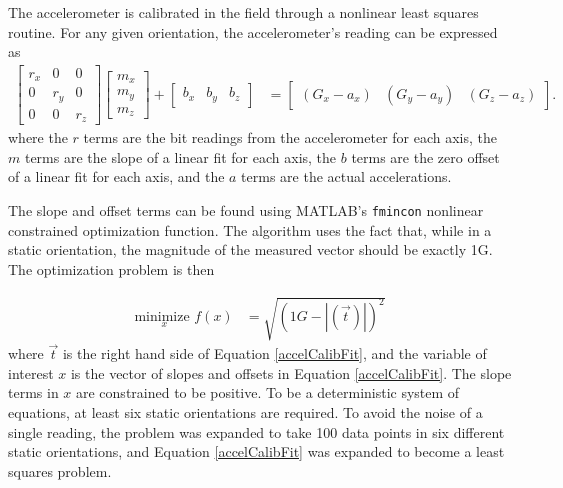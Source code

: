 The accelerometer is calibrated in the field through a nonlinear least squares routine. For any given orientation, the accelerometer's reading can be expressed as
\begin{align}
\label{accelCalibFit}
\begin{bmatrix}
r_x & 0 & 0\\ 0 & r_y & 0\\ 0 & 0 & r_z
\end{bmatrix} 
\begin{bmatrix}
m_x \\ m_y \\ m_z
\end{bmatrix} 
+ \begin{bmatrix}
b_x & b_y & b_z
\end{bmatrix}&= \begin{bmatrix} (G_x-a_x) & (G_y - a_y) & (G_z - a_z) \end{bmatrix}.
\end{align}
\noindent
where the $r$ terms are the bit readings from the accelerometer for each axis, the $m$ terms are the slope of a linear fit for each axis, the $b$ terms are the zero offset of a linear fit for each axis, and the $a$ terms are the actual accelerations.
 
 The slope and offset terms can be found using MATLAB's \texttt{fmincon} nonlinear constrained optimization function. The algorithm uses the fact that, while in a static orientation, the magnitude of the measured vector should be exactly 1G. The optimization problem is then

\begin{align}
\underset{x}{\text{minimize }} f(x) &= \sqrt{(1G-|(\vec{t})|)^2}
\end{align}
\noindent
where $\vec{t}$ is the right hand side of Equation \ref{accelCalibFit}, and the variable of interest $x$ is the vector of slopes and offsets in Equation \ref{accelCalibFit}. The slope terms in $x$ are constrained to be positive. To be a deterministic system of equations, at least six static orientations are required. To avoid the noise of a single reading, the problem was expanded to take 100 data points in six different static orientations, and Equation \ref{accelCalibFit} was expanded to become a least squares problem. 

